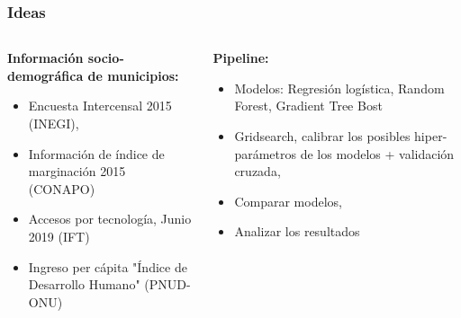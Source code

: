 \documentclass[xcolor=dvipsnames, compress]{beamer}
\begin{document}
\begin{frame}
\frametitle{Ideas}
\begin{columns}
	\begin{column}{0.5\textwidth}  %
		\textbf{Información socio-demográfica de municipios:}
		\begin{itemize}
			\item Encuesta Intercensal 2015 (INEGI),
			\item Información de índice de marginación 2015 (CONAPO)
			\item Accesos por tecnología, Junio 2019 (IFT)
			\item Ingreso per cápita "Índice de Desarrollo Humano" (PNUD-ONU)
		\end{itemize}
		
	\end{column}
	\begin{column}{0.5\textwidth}
		\textbf{Pipeline:}
		\begin{itemize}
			\item Modelos: Regresión logística, Random Forest, Gradient Tree Bost
			\item Gridsearch, calibrar los posibles hiper-parámetros de los modelos + validación cruzada,
			\item Comparar modelos,
			\item Analizar los resultados	
		\end{itemize}


	\end{column}
\end{columns}

\end{frame}
\end{document}
